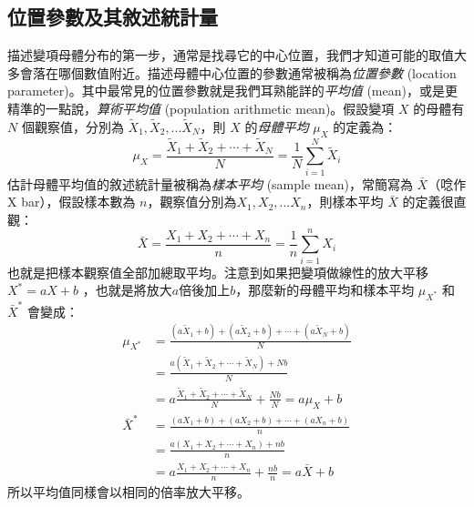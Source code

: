 \subsection{位置參數及其敘述統計量}
    描述變項母體分布的第一步，通常是找尋它的中心位置，我們才知道可能的取值大多會落在哪個數值附近。描述母體中心位置的參數通常被稱為\textit{位置參數} (location parameter)。其中最常見的位置參數就是我們耳熟能詳的\textit{平均值} (mean)，或是更精準的一點說，\textit{算術平均值} (population arithmetic mean)。假設變項 $X$ 的母體有 $N$ 個觀察值，分別為 $\tilde{X}_1, \tilde{X}_2, ... \tilde{X}_N$，則 $X$ 的\textit{母體平均} $\mu_X$ 的定義為：
    \[\mu_X = \frac{\tilde{X}_1+\tilde{X}_2+\cdots+\tilde{X}_N}{N} = \frac{1}{N}\sum_{i=1}^N \tilde{X}_i\]
    估計母體平均值的敘述統計量被稱為\textit{樣本平均} (sample mean)，常簡寫為 $\bar{X}$（唸作 X bar），假設樣本數為 $n$，觀察值分別為$X_1, X_2, ... X_n$，則樣本平均 $\bar{X}$ 的定義很直觀：
    \[\bar{X} = \frac{X_1+X_2+\cdots+X_n}{n} = \frac{1}{n}\sum_{i=1}^n X_i\]
    也就是把樣本觀察值全部加總取平均。注意到如果把變項做線性的放大平移 $X^* = aX+b$ ，也就是將放大$a$倍後加上$b$，那麼新的母體平均和樣本平均 $\mu_{X^*}$ 和 $\bar{X}^*$ 會變成：
    \begin{align*}
        \mu_{X^*} &= \frac{(a\tilde{X}_1+b)+(a\tilde{X}_2+b)+\cdots+(a\tilde{X}_N+b)}{N}\\
        &= \frac{a(\tilde{X}_1+\tilde{X}_2+\cdots+\tilde{X}_N)+Nb}{N}\\
        &= a\frac{\tilde{X}_1+\tilde{X}_2+\cdots+\tilde{X}_N}{N} + \frac{Nb}{N} = a\mu_X + b\\
        \bar{X}^* &= \frac{(aX_1+b)+(aX_2+b)+\cdots+(aX_n+b)}{n}\\
        &= \frac{a(X_1+X_2+\cdots+X_n)+nb}{n}\\
        &= a\frac{X_1+X_2+\cdots+X_n}{n}+\frac{nb}{n}=a\bar{X}+b
    \end{align*}
    所以平均值同樣會以相同的倍率放大平移。
    
